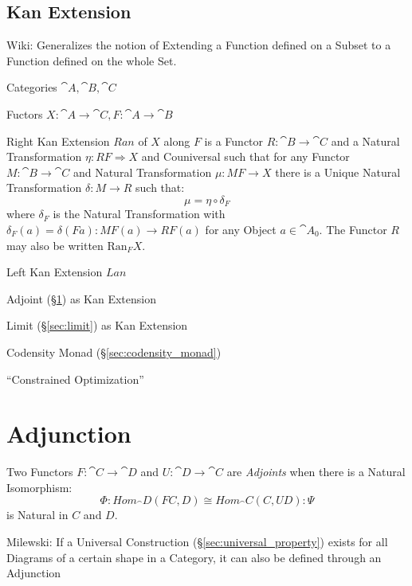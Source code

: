 \subsection{Kan Extension}\label{sec:kan_extension}

Wiki: Generalizes the notion of Extending a Function defined on a
Subset to a Function defined on the whole Set.

Categories $\cat{A}, \cat{B}, \cat{C}$

Fuctors $X : \cat{A} \rightarrow \cat{C}, F : \cat{A} \rightarrow
\cat{B}$

Right Kan Extension $Ran$ of $X$ along $F$ is a Functor $R : \cat{B}
\rightarrow \cat{C}$ and a Natural Transformation $\eta : RF
\Rightarrow X$ and Couniversal such that for any Functor $M : \cat{B}
\rightarrow \cat{C}$ and Natural Transformation $\mu : MF \rightarrow
X$ there is a Unique Natural Transformation $\delta : M \rightarrow R$
such that:
\[
  \mu = \eta \circ \delta_F
\]
where $\delta_F$ is the Natural Transformation with $\delta_F(a) =
\delta (F a) : M F(a) \rightarrow RF(a)$ for any Object $a \in
\cat{A}_0$. The Functor $R$ may also be written $\mathrm{Ran}_F X$.

Left Kan Extension $Lan$

Adjoint (\S\ref{sec:adjunction}) as Kan Extension

Limit (\S\ref{sec:limit}) as Kan Extension

Codensity Monad (\S\ref{sec:codensity_monad})

``Constrained Optimization'' %



\section{Adjunction}\label{sec:adjunction}


Two Functors $F : \cat{C} \rightarrow \cat{D}$ and $U : \cat{D}
\rightarrow \cat{C}$ are \emph{Adjoints} when there is a Natural
Isomorphism:
\[
  \Phi : Hom_\cat{D}(F C,D) \cong Hom_\cat{C}(C,U D) : \Psi
\]
is Natural in $C$ and $D$.


Milewski: If a Universal Construction (\S\ref{sec:universal_property})
exists for all Diagrams of a certain shape in a Category, it can also
be defined through an Adjunction


